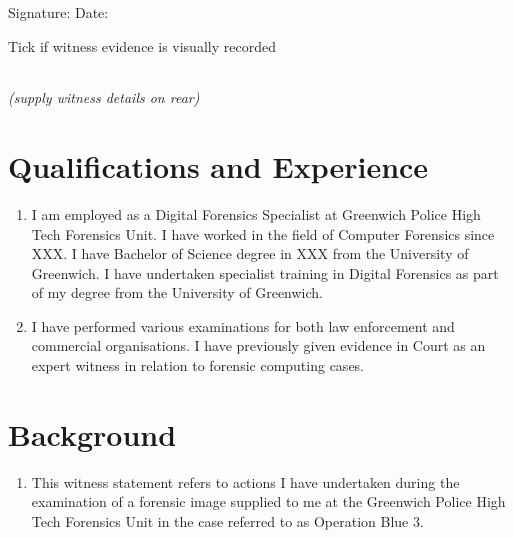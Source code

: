 \documentclass[11pt]{article}
\begin{document}
Signature: \underline{} \qquad Date: \underline{}

\bigskip\medskip

Tick if witness evidence is visually recorded \quad \begin{tabular}{|@{}p{0.25in}|} \hline
\\ \hline
\end{tabular} \quad \textit{(supply witness details on rear)}


\fontsize{11}{12}\selectfont

\section*{Qualifications and Experience}
\begin{enumerate}
    \item I am employed as a Digital Forensics Specialist at Greenwich Police High Tech Forensics Unit. I have worked in the field of Computer Forensics since XXX. I have Bachelor of Science degree in XXX from the University of Greenwich. I have undertaken specialist training in Digital Forensics as part of my degree from the University of Greenwich.
    \item I have performed various examinations for both law enforcement and commercial organisations.  I have previously given evidence in Court as an expert witness in relation to forensic computing cases.
\end{enumerate}

\section*{Background}
\begin{enumerate}[resume]
    \item This witness statement refers to actions I have undertaken during the examination of a forensic image supplied to me at the Greenwich Police High Tech Forensics Unit in the case referred to as Operation Blue 3.
\end{enumerate}


\newpage
{}
\fontsize{11}{12}\selectfont
\end{document}

